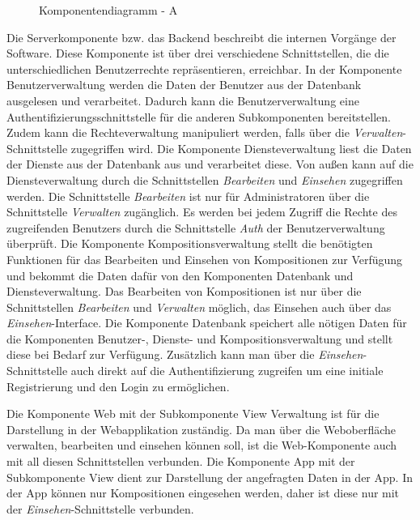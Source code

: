 \begin{figure}[h]
	\centering
	\caption{Komponentendiagramm - A}
	\label{fig:komponentendiagramm-a}
\end{figure}


Die Serverkomponente bzw. das Backend beschreibt die internen Vorgänge der Software.
Diese Komponente ist über drei verschiedene Schnittstellen, die die unterschiedlichen
Benutzerrechte repräsentieren, erreichbar.
In der Komponente Benutzerverwaltung werden die Daten der Benutzer aus der Datenbank ausgelesen und verarbeitet.
Dadurch kann die Benutzerverwaltung eine Authentifizierungsschnittstelle für die anderen Subkomponenten bereitstellen.
Zudem kann die Rechteverwaltung manipuliert werden, falls über die \textit{Verwalten}-Schnittstelle zugegriffen wird.
Die Komponente Diensteverwaltung liest die Daten der Dienste aus der Datenbank aus und verarbeitet diese.
Von außen kann auf die Diensteverwaltung durch die Schnittstellen \textit{Bearbeiten} und \textit{Einsehen} zugegriffen werden.
Die Schnittstelle \textit{Bearbeiten} ist nur für Administratoren über die Schnittstelle \textit{Verwalten} zugänglich.
Es werden bei jedem Zugriff die Rechte des zugreifenden Benutzers durch die Schnittstelle \textit{Auth} der Benutzerverwaltung überprüft.
Die Komponente Kompositionsverwaltung stellt die benötigten Funktionen für das Bearbeiten und Einsehen von Kompositionen zur Verfügung und bekommt die Daten dafür von den Komponenten Datenbank und Diensteverwaltung.
Das Bearbeiten von Kompositionen ist nur über die Schnittstellen \textit{Bearbeiten} und \textit{Verwalten} möglich, das Einsehen auch über das \textit{Einsehen}-Interface.
Die Komponente Datenbank speichert alle nötigen Daten für die Komponenten Benutzer-, Dienste- und Kompositionsverwaltung und stellt diese bei Bedarf zur Verfügung.
Zusätzlich kann man über die \textit{Einsehen}-Schnittstelle auch direkt auf die Authentifizierung zugreifen um eine initiale Registrierung und den Login zu ermöglichen.

Die Komponente Web mit der Subkomponente View Verwaltung ist für die Darstellung in der Webapplikation zuständig.
Da man über die Weboberfläche verwalten, bearbeiten und einsehen können soll, ist die Web-Komponente auch mit all diesen Schnittstellen verbunden.
Die Komponente App mit der Subkomponente View dient zur Darstellung der angefragten Daten in der App.
In der App können nur Kompositionen eingesehen werden, daher ist diese nur mit der \textit{Einsehen}-Schnittstelle verbunden.
